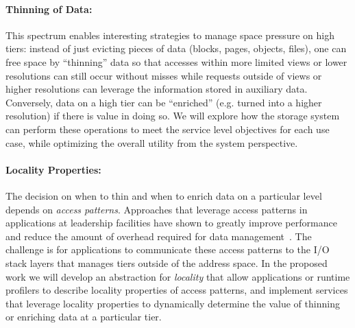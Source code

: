 \paragraph{Thinning of Data:} 
This spectrum enables interesting strategies
to manage space pressure on high tiers: instead of just evicting
pieces of data (blocks, pages, objects, files), one can free space
by ``thinning'' data so that accesses within more limited views or
lower resolutions can still occur without misses while requests
outside of views or higher resolutions can leverage the information
stored in auxiliary data. Conversely, data on a high tier can be
``enriched'' (e.g. turned into a higher resolution) if there is
value in doing so. We will explore how the storage system can perform these
operations to meet the service level objectives for each use case, while
optimizing the overall utility from the system perspective. 

\paragraph{Locality Properties:} The decision on when to thin and when to
enrich data on a particular level depends on \emph{access patterns}.
Approaches that leverage access patterns in applications at leadership facilities
 have shown to greatly improve performance and reduce the amount
of overhead required for data management~\cite{he:hpdc13}. The
challenge is for applications to communicate these access patterns
to the I/O stack layers that manages tiers outside of the address
space. In the proposed work we will develop an abstraction for
\emph{locality} that allow applications or runtime profilers to
describe locality properties of access patterns, and implement
services that leverage locality properties to dynamically determine
the value of thinning or enriching data at a particular tier.

